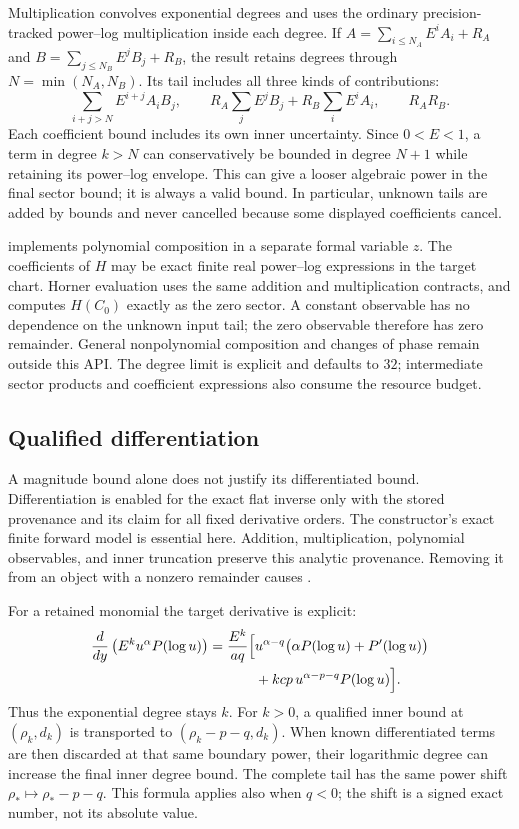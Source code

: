 Multiplication convolves exponential degrees and uses the ordinary
precision-tracked power--log multiplication inside each degree. If
$A=\sum_{i\le N_A}E^i A_i+R_A$ and
$B=\sum_{j\le N_B}E^j B_j+R_B$, the result retains degrees through
$N=\min(N_A,N_B)$. Its tail includes all three kinds of contributions:
\[
 \sum_{i+j>N}E^{i+j}A_iB_j,
 \qquad R_A\sum_j E^j B_j+R_B\sum_i E^i A_i,
 \qquad R_A R_B.
\]
Each coefficient bound includes its own inner uncertainty. Since $0<E<1$,
a term in degree $k>N$ can conservatively be bounded in degree $N+1$
while retaining its power--log envelope. This can give a looser algebraic
power in the final sector bound; it is always a valid bound. In particular,
unknown tails are added by bounds and never cancelled because some displayed
coefficients cancel.

 implements polynomial composition in a
separate formal variable $z$. The coefficients of $H$ may be exact finite
real power--log expressions in the target chart. Horner evaluation uses the
same addition and multiplication contracts, and computes $H(C_0)$ exactly
as the zero sector. A constant observable has no dependence on the unknown
input tail; the zero observable therefore has zero remainder. General
nonpolynomial composition and changes of phase remain outside this API.
The degree limit is explicit and defaults to $32$; intermediate sector
products and coefficient expressions also consume the resource budget.

\subsection{Qualified differentiation}

A magnitude bound alone does not justify its differentiated bound.
Differentiation is enabled for the exact flat inverse only with the stored
 provenance and its claim for all fixed derivative
orders. The constructor's exact finite forward model is essential here.
Addition, multiplication, polynomial observables, and inner truncation
preserve this analytic provenance. Removing it from an object with a
nonzero remainder causes .

For a retained monomial the target derivative is explicit:
\begin{align}
 \frac{d}{dy}\left(E^k u^\alpha P(\log u)\right)
 =\frac{E^k}{a q}\Bigl[&u^{\alpha-q}
       \bigl(\alpha P(\log u)+P'(\log u)\bigr)\notag\\
       &+kcp\,u^{\alpha-p-q}P(\log u)\Bigr].
 \label{eq:flat-target-derivative}
\end{align}
Thus the exponential degree stays $k$. For $k>0$, a qualified inner
bound at $(\rho_k,d_k)$ is transported to
$(\rho_k-p-q,d_k)$. When known differentiated terms are then discarded at
that same boundary power, their logarithmic degree can increase the final
inner degree bound. The complete tail has the same power shift
$\rho_*\mapsto\rho_*-p-q$. This formula applies also when $q<0$;
the shift is a signed exact number, not its absolute value.

